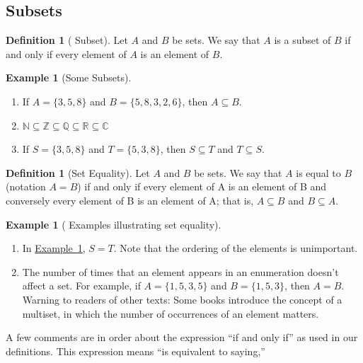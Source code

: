 \documentclass[10pt,]{book}
\theoremstyle{plain}
\theoremstyle{definition}
\newtheorem{definition}[theorem]{Definition}
\theoremstyle{definition}
\theoremstyle{definition}
\newtheorem{example}[theorem]{Example}
\theoremstyle{definition}
\numberwithin{equation}{section}
\begin{document}
\subsection[Subsets]{Subsets}\label{ss-subsets}
\begin{definition}[ Subset]\label{subset.}
\label{notation-4}
 Let \(A\) and \(B\) be sets. We say that \(A\) is a subset of \(B\)  if and only if every element of \(A\) is an element of \(B\). %
\end{definition}
\begin{example}[Some Subsets]\label{Some_Subsets}
\leavevmode%
\begin{enumerate}[label=\alph*]
\item\hypertarget{li-10}{} If \(A = \{3, 5, 8\}\) and \(B = \{5, 8, 3, 2, 6\}\), then \(A\subseteq B\). %
\item\hypertarget{li-11}{}  \(\mathbb{N}\subseteq \mathbb{Z}\subseteq \mathbb{Q}\subseteq \mathbb{R}\subseteq \mathbb{C}\) %
\item\hypertarget{li-12}{}If \(S = \{3, 5, 8\}\) and \(T = \{5, 3, 8\}\), then \(S \subseteq  T\) and \(T \subseteq  S\). %
\end{enumerate}
%
\end{example}
\begin{definition}[Set Equality]\label{set_equality}
Let \(A\) and \(B\) be sets. We say that \(A\) is equal to \(B\) (notation \(A = B\)) if and only if every element of
A is an element of B and conversely every element of B is an element of A; that is, \(A \subseteq  B\) and \(B \subseteq  A\).%
\end{definition}
\begin{example}[ Examples illustrating set equality]\label{set_equality_examples}
\leavevmode%
\begin{enumerate}[label=\alph*]
\item\hypertarget{li-13}{}In \hyperref[Some_Subsets]{Example~\ref{Some_Subsets}}, \(S = T\). Note that the ordering of the elements is unimportant. %
\item\hypertarget{li-14}{}The number of times that an element appears in an enumeration doesn't affect a set. For example, if \(A = \{1, 5, 3, 5\}\) and \(B = \{1, 5, 3\}\), then \(A = B\).  Warning to readers of other texts: Some books introduce the concept of a multiset, in which the number of occurrences of an element matters.%
\end{enumerate}
%
\end{example}
A few comments are in order about the expression ``if and only if'' as used in our definitions. This expression means ``is equivalent to saying,''
\end{document}
